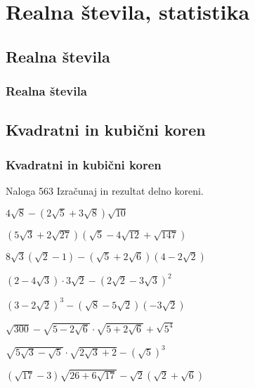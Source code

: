 \section{Realna števila, statistika}

\begin{frame}
    \sectionpage
\end{frame}

\begin{frame}
\end{frame}

    \subsection{Realna števila}

        \begin{frame}
            \frametitle{Realna števila}
        \end{frame}

    \subsection{Kvadratni in kubični koren}

        \begin{frame}
            \frametitle{Kvadratni in kubični koren}
        \end{frame}

        \begin{frame}
            \begin{exampleblock}{Naloga 563}
                Izračunaj in rezultat delno koreni.
                \begin{description}
                    \item<2->[(b)] $\displaystyle 4\sqrt{8}-\left(2\sqrt{5}+3\sqrt{8}\right)\sqrt{10}$
                    \item<3->[(č)] $\displaystyle\left(5\sqrt{3}+2\sqrt{27}\right)\left(\sqrt{5}-4\sqrt{12}+\sqrt{147}\right)$
                    \item<4->[(g)] $\displaystyle 8\sqrt{3}\left(\sqrt{2}-1\right)-\left(\sqrt{5}+2\sqrt{6}\right)\left(4-2\sqrt{2}\right)$  
                    \item<5->[(j)] $\displaystyle\left(2-4\sqrt{3}\right)\cdot 3\sqrt{2}-\left(2\sqrt{2}-3\sqrt{3}\right)^2$
                    \item<6->[(l)] $\displaystyle\left(3-2\sqrt{2}\right)^3-\left(\sqrt{8}-5\sqrt{2}\right)\left(-3\sqrt{2}\right)$
                    \item<7->[(o)] $\displaystyle\sqrt{300}-\sqrt{5-2\sqrt{6}}\cdot\sqrt{5+2\sqrt{6}}+\sqrt{5^4}$
                    \item<8->[(r)] $\displaystyle\sqrt{5\sqrt{3}-\sqrt{5}}\cdot\sqrt{2\sqrt{3}+2}-\left(\sqrt{5}\right)^3$  
                    \item<9->[(u)] $\displaystyle\left(\sqrt{17}-3\right)\sqrt{26+6\sqrt{17}}-\sqrt{2}\left(\sqrt{2}+\sqrt{6}\right)$
                \end{description}
            \end{exampleblock}
        \end{frame}


